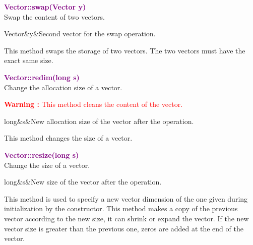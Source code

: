 \textcolor{purple}{\textbf{Vector::swap(Vector y)}}\label{Vector::swap(Vector y)}\\
Swap the content of two vectors.

\begin{tcolorbox}[width=\textwidth,myArgs,tabularx={ll|R}]
Vector&y&Second vector for the swap operation.
\end{tcolorbox}

This method swaps the storage of two vectors. The two vectors must have the exact same size.

\textcolor{purple}{\textbf{Vector::redim(long s)}}\label{Vector::redim(long s)}\\
Change the allocation size of a vector.

\hspace*{10mm}\textcolor{red}{\textbf{Warning :} This method cleans the content of the vector.}

\begin{tcolorbox}[width=\textwidth,myArgs,tabularx={ll|R}]
long&s&New allocation size of the vector after the operation.
\end{tcolorbox}

This method changes the size of a vector.

\textcolor{purple}{\textbf{Vector::resize(long s)}}\label{Vector::resize(long s)}\\
Change the size of a vector.

\begin{tcolorbox}[width=\textwidth,myArgs,tabularx={ll|R}]
long&s&New size of the vector after the operation.
\end{tcolorbox}

This method is used to specify a new vector dimension of the one given during initialization by the constructor.
This method makes a copy of the previous vector according to the new size, \ie it can shrink or expand the vector.
If the new vector size is greater than the previous one, zeros are added at the end of the vector.

